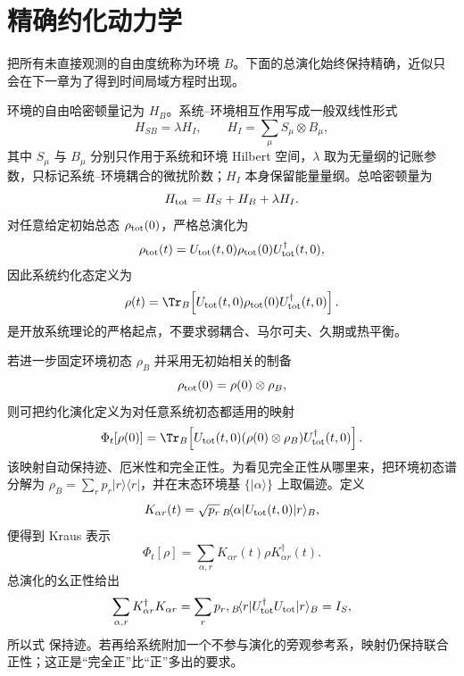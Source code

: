 \section{精确约化动力学}
\label{sec:phys-oqs-exact}

把所有未直接观测的自由度统称为环境 $B$。下面的总演化始终保持精确，近似只会在下一章为了得到时间局域方程时出现。

环境的自由哈密顿量记为 $H_B$。系统--环境相互作用写成一般双线性形式
\begin{equation}
H_{SB}=\lambda H_I,
\qquad
H_I=\sum_\mu S_\mu\otimes B_\mu,
\label{eq:phys-oqs-general-system-bath}
\end{equation}
其中 $S_\mu$ 与 $B_\mu$ 分别只作用于系统和环境 Hilbert 空间，$\lambda$ 取为无量纲的记账参数，只标记系统--环境耦合的微扰阶数；$H_I$ 本身保留能量量纲。总哈密顿量为
\begin{equation}
H_{\rm tot}=H_S+H_B+\lambda H_I.
\label{eq:phys-oqs-total-h}
\end{equation}
对任意给定初始总态 $\rho_{\rm tot}(0)$，严格总演化为
\[
\rho_{\rm tot}(t)
=U_{\rm tot}(t,0)\rho_{\rm tot}(0)U_{\rm tot}^\dagger(t,0),
\]
因此系统约化态定义为
\begin{equation}
\rho(t)=\Tr_B\!\left[
U_{\rm tot}(t,0)\rho_{\rm tot}(0)U_{\rm tot}^\dagger(t,0)
\right].
\label{eq:phys-oqs-exact-reduced-state}
\end{equation}
 是开放系统理论的严格起点，不要求弱耦合、马尔可夫、久期或热平衡。

若进一步固定环境初态 $\rho_B$ 并采用无初始相关的制备
\begin{equation}
\rho_{\rm tot}(0)=\rho(0)\otimes\rho_B,
\label{eq:phys-oqs-factorized-initial-state}
\end{equation}
则可把约化演化定义为对任意系统初态都适用的映射
\begin{equation}
\Phi_t[\rho(0)]
=\Tr_B\!\left[
U_{\rm tot}(t,0)(\rho(0)\otimes\rho_B)U_{\rm tot}^\dagger(t,0)
\right].
\label{eq:phys-oqs-exact-reduced-map}
\end{equation}
该映射自动保持迹、厄米性和完全正性。为看见完全正性从哪里来，把环境初态谱分解为 $\rho_B=\sum_r p_r|r\rangle\langle r|$，并在末态环境基 $\{|\alpha\rangle\}$ 上取偏迹。定义
\begin{equation}
K_{\alpha r}(t)=\sqrt{p_r}\,{}_B\!\langle\alpha|U_{\rm tot}(t,0)|r\rangle_B,
\label{eq:oqs-kraus-operators}
\end{equation}
便得到 Kraus 表示
\begin{equation}
\Phi_t[\rho]=\sum_{\alpha,r}K_{\alpha r}(t)\rho K_{\alpha r}^\dagger(t).
\label{eq:oqs-kraus-map}
\end{equation}
总演化的幺正性给出
\[
\sum_{\alpha,r}K_{\alpha r}^\dagger K_{\alpha r}
=\sum_r p_r,{}_B\!\langle r|U_{\rm tot}^\dagger U_{\rm tot}|r\rangle_B=I_S,
\]
所以式  保持迹。若再给系统附加一个不参与演化的旁观参考系，映射仍保持联合正性；这正是“完全正”比“正”多出的要求。

